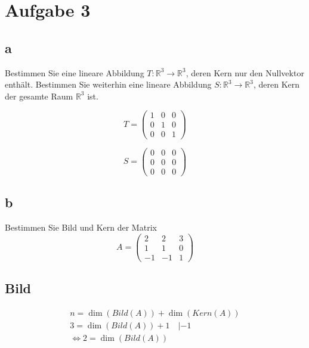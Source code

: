 \section{Aufgabe 3}

\subsection{a}
Bestimmen Sie eine lineare Abbildung $T: \mathbb{R}^3 \rightarrow
    \mathbb{R}^3$, deren Kern nur den Nullvektor enthält. Bestimmen Sie weiterhin
eine lineare Abbildung $S: \mathbb{R}^3 \rightarrow \mathbb{R}^3$, deren Kern
der gesamte Raum $\mathbb{R}^3$ ist.

\[
    T = \begin{pmatrix}
        1 & 0 & 0 \\
        0 & 1 & 0 \\
        0 & 0 & 1
    \end{pmatrix}
\]

\[
    S = \begin{pmatrix}
        0 & 0 & 0 \\
        0 & 0 & 0 \\
        0 & 0 & 0
    \end{pmatrix}
\]

\subsection{b}
Bestimmen Sie Bild und Kern der Matrix
\[
    A=\begin{pmatrix}
        2 & 2 & 3 \\ 1 & 1 & 0 \\ -1 & -1 & 1
    \end{pmatrix}
\]

\subsection*{Bild}

\begin{align*}
    n = \dim(Bild(A)) + \dim(Kern(A)) \\
    3 = \dim(Bild(A)) + 1 \quad |-1   \\
    \Leftrightarrow  2 = \dim(Bild(A))
\end{align*}

